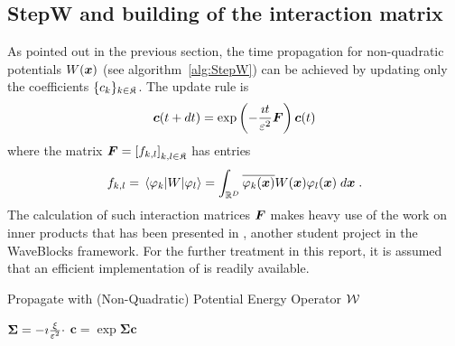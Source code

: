 \subsection{StepW and building of the interaction matrix}
%
As pointed out in the previous section, the time propagation for non-quadratic potentials $W(\bm{x})$ (see algorithm~\ref{alg:StepW}) can be achieved by updating only the coefficients $\{ c_k \}_{k \in \mathfrak{K}}$.
The update rule is
%
\begin{align}
	\bm{c}(t + dt) = \exp \left( - \frac{\imath t}{\varepsilon^2} \bm{F} \right) \bm{c}(t)
\end{align}
%
where the matrix $\bm{F} = \left[ f_{k,l} \right]_{k,l \in \mathfrak{K}}$ has entries
%
\begin{align}
	f_{k,l} = \matrixel{\varphi_k}{W}{\varphi_l}
	= \int_{\R^D} \conj{\varphi_k(\bvec{x})} W(\bvec{x}) \varphi_l(\bvec{x}) \; \dif \bvec{x} \; .
\end{align}
%
The calculation of such interaction matrices $\bm{F}$ makes heavy use of the work on inner products that has been presented in \cite{LWB_innerproducts}, another student project in the WaveBlocks framework.
For the further treatment in this report, it is assumed that an efficient implementation of  is readily available.
%
\begin{algorithm}[ht]
	\caption{Propagate with (Non-Quadratic) Potential Energy Operator $\mathcal{W}$}
	\label{alg:StepW}
	\begin{algorithmic}
		\State
			\State $\bm{\Sigma} = - \imath \frac{\xi}{\varepsilon^2} \cdot$ 
			\State $\bm{c} = \exp{\bm{\Sigma}} \bm{c}$
		\EndProcedure
		\State
	\end{algorithmic}
\end{algorithm}
